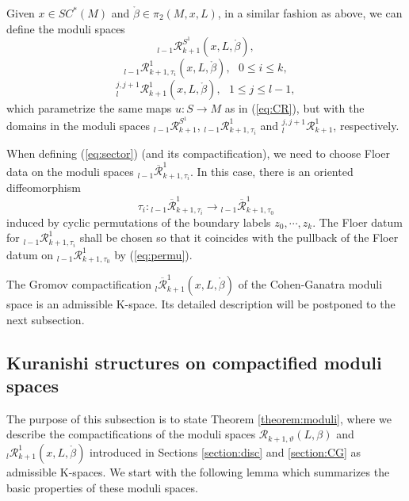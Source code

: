 \documentclass[a4paper]{article}
\numberwithin{equation}{section}
\begin{document}
Given $x\in\mathit{SC}^\ast(M)$ and $\ring{\beta}\in\pi_2(M,x,L)$, in a similar fashion as above, we can define the moduli spaces
\begin{equation}
{}_{l-1}\mathcal{R}_{k+1}^{S^1}(x,L,\ring{\beta}),
\end{equation}
\begin{equation}\label{eq:sector}
{}_{l-1}\mathcal{R}_{k+1,\tau_i}^1(x,L,\ring{\beta}),\textrm{ }0\leq i\leq k,
\end{equation}
\begin{equation}
{}_l^{j,j+1}\mathcal{R}_{k+1}^1(x,L,\ring{\beta}),\textrm{ }1\leq j\leq l-1,
\end{equation}
which parametrize the same maps $u:S\rightarrow M$ as in (\ref{eq:CR}), but with the domains in the moduli spaces ${}_{l-1}\mathcal{R}_{k+1}^{S^1}$, ${}_{l-1}\mathcal{R}_{k+1,\tau_i}^1$ and ${}_l^{j,j+1}\mathcal{R}_{k+1}^1$, respectively. 

When defining (\ref{eq:sector}) (and its compactification), we need to choose Floer data on the moduli spaces ${}_{l-1}\overline{\mathcal{R}}_{k+1,\tau_i}^1$. In this case, there is an oriented diffeomorphism
\begin{equation}\label{eq:permu}
\tau_i:{}_{l-1}\overline{\mathcal{R}}_{k+1,\tau_i}^1\rightarrow{}_{l-1}\overline{\mathcal{R}}_{k+1,\tau_0}^1
\end{equation}
induced by cyclic permutations of the boundary labels $z_0,\cdots,z_k$. The Floer datum for ${}_{l-1}\mathcal{R}_{k+1,\tau_i}^1$ shall be chosen so that it coincides with the pullback of the Floer datum on ${}_{l-1}\mathcal{R}_{k+1,\tau_0}^1$ by (\ref{eq:permu}).

The Gromov compactification ${}_l\overline{\mathcal{R}}_{k+1}^1(x,L,\ring{\beta})$ of the Cohen-Ganatra moduli space is an admissible K-space. Its detailed description will be postponed to the next subsection. 

\subsection{Kuranishi structures on compactified moduli spaces}\label{section:compactify}

The purpose of this subsection is to state Theorem \ref{theorem:moduli}, where we describe the compactifications of the moduli spaces $\mathcal{R}_{k+1,\vartheta}(L,\beta)$ and ${}_l\mathcal{R}_{k+1}^1(x,L,\ring{\beta})$ introduced in Sections \ref{section:disc} and \ref{section:CG} as admissible K-spaces. We start with the following lemma which summarizes the basic properties of these moduli spaces.
\end{document}

